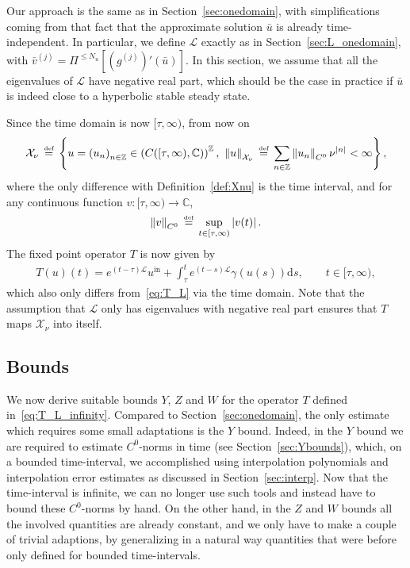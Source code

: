 \documentclass[10pt,a4paper]{article}
\theoremstyle{plain}
\newcommand{\ZZ}{\mathbb Z}
\newcommand{\CC}{\mathbb C}
\renewcommand{\L}{\mathcal{L}}
\newcommand{\X}{\mathcal{X}}
\newcommand{\bu}{\bar{u}}
\newcommand{\bv}{\bar{v}}
\newcommand{\1}{\mathbf{1}}
\renewcommand{\d}{\mathrm{d}}
\newcommand{\uin}{{u^{\mathrm{in}}}}
\newcommand{\bydef}{\,\stackrel{\mbox{\tiny\textnormal{\raisebox{0ex}[0ex][0ex]{def}}}}{=}\,}
\newcommand{\Nu}{N_{u}}
\begin{document}
Our approach is the same as in Section~\ref{sec:onedomain}, with simplifications coming from that fact that the approximate solution $\bu$ is already time-independent. In particular, we define $\L$ exactly as in Section~\ref{sec:L_onedomain}, with $\bv^{(j)} = \Pi^{\leq \Nu} \left[\left(g^{(j)}\right)'(\bu)\right]$. In this section, we assume that all the eigenvalues of $\L$ have negative real part, which should be the case in practice if $\bu$ is indeed close to a hyperbolic stable steady state.

Since the time domain is now $[\tau,\infty)$, from now on
\begin{align*}
\X_\nu \bydef \left\{ u = \left(u_n\right)_{n\in\ZZ}\in \left(C([\tau,\infty),\CC)\right)^\ZZ,\ \left\Vert u\right\Vert_{\X_\nu} \bydef \sum_{n\in\ZZ} \left\Vert u_n\right\Vert_{C^0} \nu^{\vert n\vert} < \infty \right\},
\end{align*}
where the only difference with Definition~\ref{def:Xnu} is the time interval, and for any continuous function $v:[\tau,\infty) \to \CC$,
\begin{align*}
\left\Vert v\right\Vert_{C^0} \bydef \sup_{t\in [\tau,\infty)} \left\vert v(t)\right\vert.
\end{align*}
The fixed point operator $T$ is now given by
\begin{align}
\label{eq:T_L_infinity}
T(u)(t) = e^{(t-\tau)\L} \uin + \int_\tau^t e^{(t-s)\L} \gamma(u(s)) \d s,\qquad t\in[\tau,\infty),
\end{align}
which also only differs from~\eqref{eq:T_L} via the time domain. Note that the assumption that $\L$ only has eigenvalues with negative real part ensures that $T$ maps $\X_\nu$ into itself.

\subsection{Bounds}
\label{sec:infinity_bounds}

We now derive suitable bounds $Y$, $Z$ and $W$ for the operator $T$ defined in~\eqref{eq:T_L_infinity}. Compared to Section~\ref{sec:onedomain}, the only estimate which requires some small adaptations is the $Y$ bound. Indeed, in the $Y$ bound we are required to estimate $C^0$-norms in time (see Section~\ref{sec:Ybounds}), which, on a bounded time-interval, we accomplished using interpolation polynomials and interpolation error estimates as discussed in Section~\ref{sec:interp}. Now that the time-interval is infinite, we can no longer use such tools and instead have to bound these $C^0$-norms by hand. On the other hand, in the $Z$ and $W$ bounds all the involved quantities are already constant, and we only have to make a couple of trivial adaptions, by generalizing in a natural way quantities that were before only defined for bounded time-intervals.
\end{document}
